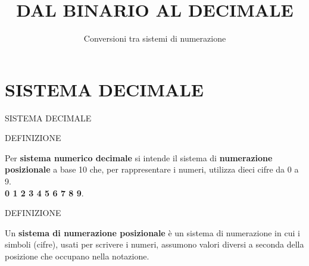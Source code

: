\documentclass[aspectratio=1610, handout]{beamer}
\title{DAL BINARIO AL DECIMALE}
\subtitle{Conversioni tra sistemi di numerazione}
\date{}
\institute{\textit{
        Fonti:
        \begin{itemize}
            \item[-] \href{https://catalogo.sanoma.it/si-op-104157-dal-bit-all-intelligenza-artificiale.html}{Dal BIT all'INTELLIGENZA ARTIFICIALE}
            \item[-] \href{https://it.wikipedia.org/wiki/Sistema_numerico_decimale}{Wikipedia} 
        \end{itemize}
    }
}
\begin{document}
\begin{frame}
    \titlepage
\end{frame}

\section{SISTEMA DECIMALE}

\begin{frame}{SISTEMA DECIMALE}
    \begin{alertblock}{DEFINIZIONE}
        \begin{minipage}{0.98\linewidth}
            \justifying
            Per \textbf{sistema numerico decimale} si intende il sistema di \textbf{numerazione posizionale} a 
            base 10 che, per rappresentare i numeri, utilizza dieci cifre da 0 a 9.\\
            \textbf{0 1 2 3 4 5 6 7 8 9}.
        \end{minipage}
    \end{alertblock}
    \pause
    \begin{alertblock}{DEFINIZIONE}
        \begin{minipage}{0.98\linewidth}
            \justifying
            Un \textbf{sistema di numerazione posizionale} è un sistema di numerazione in cui 
            i simboli (cifre), usati per scrivere i numeri, assumono valori diversi a seconda 
            della posizione che occupano nella notazione.
        \end{minipage}
    \end{alertblock}
\end{frame}
\end{document}
